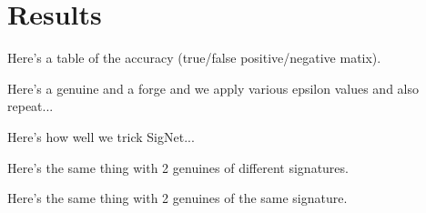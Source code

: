 \section{Results}\label{sec:results}

Here's a table of the accuracy (true/false positive/negative matix).

Here's a genuine and a forge and we apply various epsilon values and also repeat...

Here's how well we trick SigNet...

Here's the same thing with 2 genuines of different signatures.

Here's the same thing with 2 genuines of the same signature.
